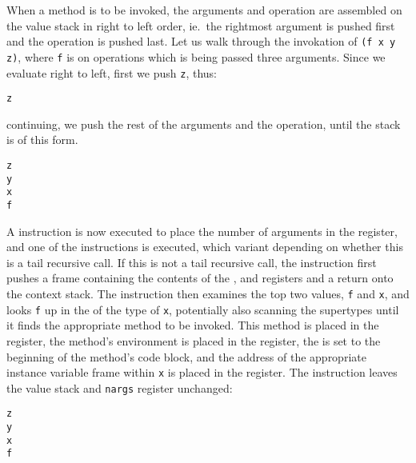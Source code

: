 When a method is to be invoked, the arguments and operation are
assembled on the value stack in right to left order, ie.\ the
rightmost argument is pushed first and the operation is pushed last.
Let us walk through the invokation of {\tt (f x y z)}, where {\tt f}
is on operations which is being passed three arguments.  Since we
evaluate right to left, first we push {\tt z}, thus:
\begin{stackphoto}
\tt z \\\hline
\end{stackphoto}
continuing, we push the rest of the arguments and the operation, until
the stack is of this form.
\begin{stackphoto}
\tt z \\\hline
\tt y \\\hline
\tt x \\\hline
\tt f \\\hline
\end{stackphoto}
A  instruction is now executed to place the number
of arguments in the  register, and one of the 
instructions is executed, which variant depending on whether this is a
tail recursive call.  If this is not a tail recursive call, the
 instruction first pushes a frame containing the contents
of the ,  and  registers
and a return  onto the context stack.  The instruction then
examines the top two values, {\tt f} and {\tt x}, and looks {\tt f} up
in the  of the type of {\tt x}, potentially
also scanning the supertypes until it finds the appropriate method to
be invoked.  This method is placed in the 
register, the method's environment is placed in the  register,
the  is set to the beginning of the method's code block, and
the address of the appropriate instance variable frame within {\tt x} is
placed in the  register.  The  instruction leaves
the value stack and {\tt nargs} register unchanged:
\begin{stackphoto}
\tt z \\\hline
\tt y \\\hline
\tt x \\\hline
\tt f \\\hline
\end{stackphoto}

